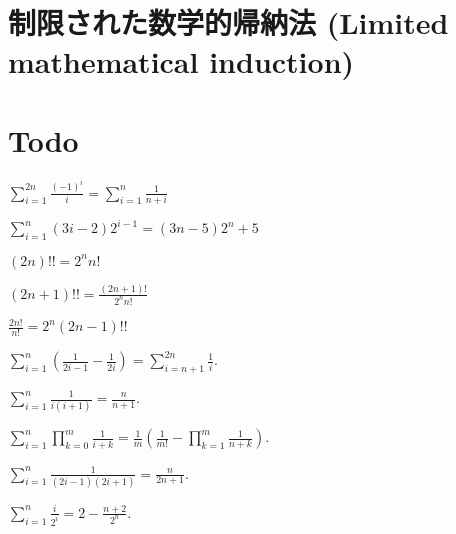 \section{制限された数学的帰納法 (Limited mathematical induction)}


\section{Todo}












\begin{prop}
  $\sum_{i=1}^{2n}\frac{(-1)^i}{i}=\sum_{i=1}^n\frac{1}{n+i}$
\end{prop}

\begin{prop}
  $\sum_{i=1}^n (3i-2)2^{i-1}=(3n-5)2^n+5$
\end{prop}



\begin{prop}
  $(2n)!!=2^nn!$
\end{prop}
\begin{prop}
  $(2n+1)!!=\frac{(2n+1)!}{2^nn!}$
\end{prop}
\begin{prop}
  $\frac{2n!}{n!}=2^n(2n-1)!!$
\end{prop}

\begin{prop}
  $\sum_{i=1}^n\left( \frac{1}{2i-1}-\frac{1}{2i}\right)=\sum_{i=n+1}^{2n}\frac{1}{i}$.
\end{prop}

\begin{prop}
  $\sum_{i=1}^n\frac{1}{i(i+1)}=\frac{n}{n+1}$.
\end{prop}

\begin{prop}
  $\sum_{i=1}^n\prod_{k=0}^{m}\frac{1}{i+k}=\frac{1}{m}\left(\frac{1}{m!}-\prod_{k=1}^m\frac{1}{n+k}\right)$.
\end{prop}


\begin{prop}
  $\sum_{i=1}^n\frac{1}{(2i-1)(2i+1)}=\frac{n}{2n+1}$.
\end{prop}

\begin{prop}
  $\sum_{i=1}^n\frac{i}{2^i}=2-\frac{n+2}{2^n}$.
\end{prop}


